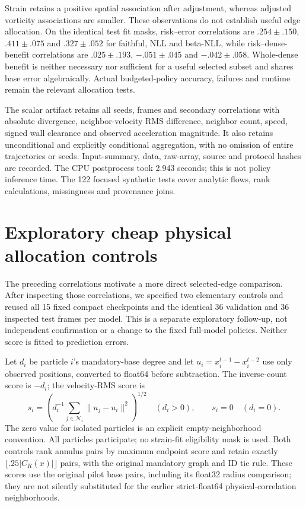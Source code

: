 Strain retains a positive spatial association after adjustment, whereas
adjusted vorticity associations are smaller. These observations do not
establish useful edge allocation. On the identical test fit masks,
risk--error correlations are $.254\pm.150$, $.411\pm.075$ and $.327\pm.052$
for faithful, NLL and beta-NLL, while risk--dense-benefit correlations are
$.025\pm.193$, $-.051\pm.045$ and $-.042\pm.058$.
Whole-dense benefit is neither necessary nor sufficient for a useful
selected subset and shares base error algebraically. Actual budgeted-policy
accuracy, failures and runtime remain the relevant allocation tests.

The scalar artifact retains all seeds, frames and secondary correlations
with absolute divergence, neighbor-velocity RMS difference, neighbor count,
speed, signed wall clearance and observed acceleration magnitude. It also
retains unconditional and explicitly conditional aggregation, with no
omission of entire trajectories or seeds. Input-summary, data, raw-array,
source and protocol hashes are recorded. The CPU postprocess took 2.943
seconds; this is not policy inference time. The 122 focused synthetic tests
cover analytic flows, rank calculations, missingness and provenance joins.


\section{Exploratory cheap physical allocation controls}
\label{sec:physical-allocation}
The preceding correlations motivate a more direct selected-edge comparison.
After inspecting those correlations, we specified two elementary controls and
reused all 15 fixed compact checkpoints and the identical 36 validation and
36 inspected test frames per model. This is a separate exploratory follow-up,
not independent confirmation or a change to the fixed full-model policies.
Neither score is fitted to prediction errors.

Let $d_i$ be particle $i$'s mandatory-base degree and let
$u_i=x_i^{t-1}-x_i^{t-2}$ use only observed positions, converted to float64
before subtraction. The inverse-count score is $-d_i$; the velocity-RMS score is
\begin{equation}
 s_i=\left(d_i^{-1}\sum_{j\in\mathcal N_i}\|u_j-u_i\|^2\right)^{1/2}
 \quad(d_i>0),\qquad s_i=0\quad(d_i=0).
\end{equation}
The zero value for isolated particles is an explicit empty-neighborhood
convention. All particles participate; no strain-fit eligibility mask is used.
Both controls rank annulus pairs by maximum endpoint score and retain exactly
$\lfloor .25|C_R(x)|\rfloor$ pairs, with the original mandatory graph and ID
tie rule. These scores use the original pilot base pairs, including its float32
radius comparison; they are not silently substituted for the earlier
strict-float64 physical-correlation neighborhoods.


